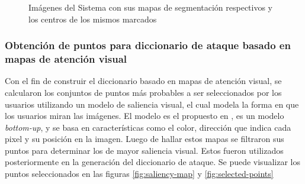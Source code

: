 \begin{figure}[H]
\begin{minipage}[hb]{0.3\textwidth}
	\end{minipage}
	\caption{Imágenes del Sistema con sus mapas de segmentaci\'on respectivos y los centros de los mismos marcados}
	\label{fig:images-segments}
\end{figure}

\subsubsection{Obtenci\'on de puntos para diccionario de ataque basado en mapas de atenci\'on visual}
Con el fin de construir el diccionario basado en mapas de atención visual, se calcularon los conjuntos de  puntos m\'as probables a ser seleccionados por los usuarios utilizando un modelo de saliencia visual, el cual modela la forma en que los usuarios miran las im\'agenes. El modelo es el propuesto en \cite{itti2000saliency}, es un modelo \textit{bottom-up}, y se basa en caracter\'isticas como el color, direcci\'on que indica cada pixel y su posici\'on en la imagen. Luego de hallar estos mapas se filtraron sus puntos para determinar los de mayor saliencia visual. Estos fueron utilizados posteriormente en la generaci\'on del diccionario de ataque. Se puede visualizar los puntos seleccionados en las figuras \ref{fig:saliency-map} y \ref{fig:selected-points}

